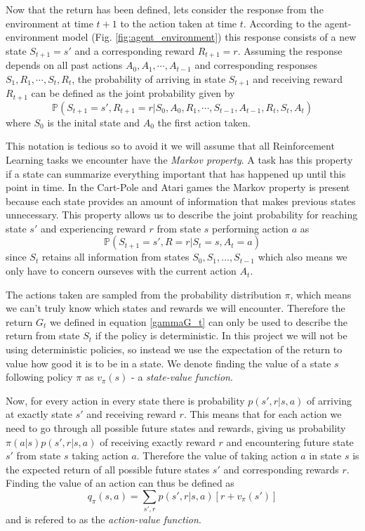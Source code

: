 \documentclass[11pt]{article}
\begin{document}
Now that the return has been defined, lets consider the response from the environment at time $t + 1$
to the action taken at time $t$.
According to the agent-environment model (Fig. \ref{fig:agent_environment}) this response consists
of a new state $S_{t+1} = s'$ and a corresponding reward $R_{t+1} = r$.
Assuming the response depends on all past actions $A_{0}, A_{1}, \cdots, A_{t-1}$ and
corresponding responses $S_{1}, R_{1}, \cdots, S_{t}, R_{t}$, the probability
of arriving in state $S_{t+1}$ and receiving reward $R_{t+1}$ can be defined as the
joint probability given by
\begin{equation}
    \mathds{P}(S_{t+1} = s', R_{t+1} = r | S_0, A_0, R_1, \cdots, S_{t-1}, A_{t-1}, R_{t}, S_{t}, A_{t})
\end{equation}
where $S_0$ is the inital state and $A_0$ the first action taken.

This notation is tedious so to avoid it we will assume that all Reinforcement Learning tasks
we encounter have the \textit{Markov property}.
A task has this property if a state can summarize everything important that
has happened up until this point in time.
In the Cart-Pole and Atari games the Markov property is present because each state provides
an amount of information that makes previous states unnecessary.
This property allows us to describe the joint probability for reaching state $s'$ and
experiencing reward $r$ from state $s$ performing action $a$ as
\begin{equation}\label{joint_prob}
    \mathds{P}(S_{t+1} = s', R = r | S_t = s, A_t = a)
\end{equation}
since $S_t$ retains all information from states $S_0, S_1, \dots, S_{t-1}$
which also means we only have to concern ourseves with the current action $A_t$.

The actions taken are sampled from the probability distribution $\pi$, which means
we can't truly know which states and rewards we will encounter.
Therefore the return $G_t$ we defined in equation \ref{gammaG_t}
can only be used to describe the return from state $S_t$ if 
the policy is deterministic.
In this project we will not be using deterministic policies, so 
instead we use the expectation of the return to value how
good it is to be in a state.
We denote finding the value of a state $s$ following policy $\pi$ as
$v_\pi(s)$ - a \textit{state-value function}.

Now, for every action in every state there is
probability $p(s', r | s, a)$ of arriving at exactly state $s'$ and
receiving reward $r$.
This means that for each action we need to go through all possible future
states and rewards, giving us probability $\pi(a|s)p(s',r|s, a)$ of receiving
exactly reward $r$ and encountering future state $s'$ from state $s$ taking
action $a$.
Therefore the value of taking action $a$ in state $s$ is the expected
return of all possible future states $s'$ and corresponding rewards $r$.
Finding the value of an action can thus be defined as
\begin{equation}
    q_\pi(s, a) = \sum\limits_{s', r} p(s', r | s, a) [r + v_\pi(s')]
\end{equation}
and is refered to as the \textit{action-value function}.
\end{document}

